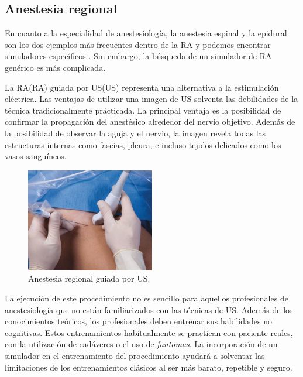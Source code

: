 \subsection{Anestesia regional}
\label{art:rasimas}

En cuanto a la especialidad de anestesiología, la anestesia espinal y la epidural son los dos ejemplos más frecuentes dentro de la \ac{RA} y podemos encontrar simuladores específicos \cite{broom2018evaluation}. Sin embargo, la búsqueda de un simulador de \ac{RA} genérico es más complicada.


La \acl{RA}(\acs{RA}) guiada por \acl{US}(\acs{US}) representa una alternativa a la estimulación eléctrica. Las ventajas de utilizar una imagen de \ac{US} solventa las debilidades de la técnica tradicionalmente prácticada. La principal ventaja es la posibilidad de confirmar la propagación del anestésico alrededor del nervio objetivo. Además de la posibilidad de observar la aguja y el nervio, la imagen revela todas las estructuras internas como fascias, pleura, e incluso tejidos delicados como los vasos sanguíneos. 

\begin{figure}[h]
   \centering
    \includegraphics[width=0.5\textwidth]{IMG/RAUS.png}
    \caption{ Anestesia regional guiada por \acl{US}.}
   \label{fig:raus}
\end{figure}

La ejecución de este procedimiento no es sencillo para aquellos profesionales de anestesiología que no están familiarizados con las técnicas de \ac{US}. Además de los conocimientos teóricos, los profesionales deben entrenar sus habilidades no cognitivas. Estos entrenamientos habitualmente se practican con paciente reales, con la utilización de cadáveres\cite{Tsui2007} o el uso de \emph{fantomas}\cite{phantomra}. La incorporación de un simulador en el entrenamiento del procedimiento ayudará a solventar las limitaciones de los entrenamientos clásicos al ser más barato, repetible y seguro.


